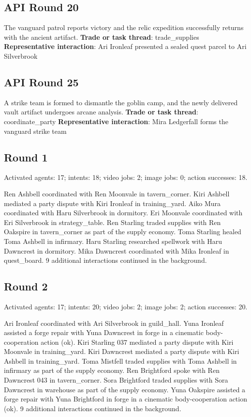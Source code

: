 \documentclass[11pt,a4paper]{article}
\begin{document}
\subsection{API Round 20}
The vanguard patrol reports victory and the relic expedition successfully returns with the ancient artifact.
\newline \textbf{Trade or task thread}: trade\_supplies
\newline \textbf{Representative interaction}: Ari Ironleaf presented a sealed quest parcel to Ari Silverbrook

\subsection{API Round 25}
A strike team is formed to dismantle the goblin camp, and the newly delivered vault artifact undergoes arcane analysis.
\newline \textbf{Trade or task thread}: coordinate\_party
\newline \textbf{Representative interaction}: Mira Ledgerfall forms the vanguard strike team

\subsection{Round 1}
Activated agents: 17; intents: 18; video jobs: 2; image jobs: 0; action successes: 18.

Ren Ashbell coordinated with Ren Moonvale in tavern\_corner. Kiri Ashbell mediated a party dispute with Kiri Ironleaf in training\_yard. Aiko Mura coordinated with Haru Silverbrook in dormitory. Eri Moonvale coordinated with Eri Silverbrook in strategy\_table. Ren Starling traded supplies with Ren Oakspire in tavern\_corner as part of the supply economy. Toma Starling healed Toma Ashbell in infirmary. Haru Starling researched spellwork with Haru Dawncrest in dormitory. Mika Dawncrest coordinated with Mika Ironleaf in quest\_board. 9 additional interactions continued in the background.

\subsection{Round 2}
Activated agents: 17; intents: 20; video jobs: 2; image jobs: 2; action successes: 20.

Ari Ironleaf coordinated with Ari Silverbrook in guild\_hall. Yuna Ironleaf assisted a forge repair with Yuna Dawncrest in forge in a cinematic body-cooperation action (ok). Kiri Starling 037 mediated a party dispute with Kiri Moonvale in training\_yard. Kiri Dawncrest mediated a party dispute with Kiri Ashbell in training\_yard. Toma Mistfell traded supplies with Toma Ashbell in infirmary as part of the supply economy. Ren Brightford spoke with Ren Dawncrest 043 in tavern\_corner. Sora Brightford traded supplies with Sora Dawncrest in warehouse as part of the supply economy. Yuna Oakspire assisted a forge repair with Yuna Brightford in forge in a cinematic body-cooperation action (ok). 9 additional interactions continued in the background.
\end{document}

